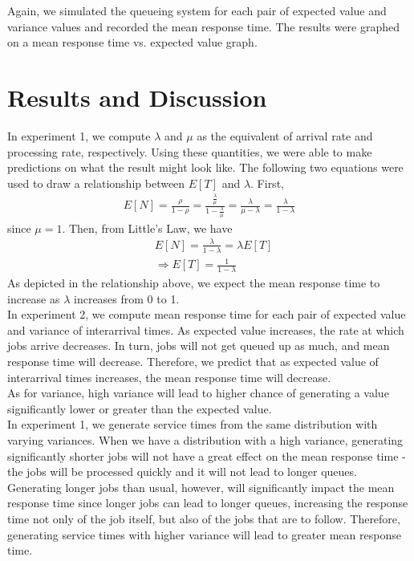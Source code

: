 \documentclass[12pt]{article}
\begin{document}
Again, we simulated the queueing system for each pair of expected value and variance values and recorded the mean response time. The results were graphed on a mean response time vs. expected value graph. 

\section{Results and Discussion} 
In experiment 1, we compute $\lambda$ and $\mu$ as the equivalent of arrival rate and processing rate, respectively. Using these quantities, we were able to make predictions on what the result might look like. The following two equations were used to draw a relationship between $E[T]$ and $\lambda$. First,
\begin{align*}
E[N] = \frac{\rho}{1 - \rho} = \frac{\frac{\lambda}{\mu}}{1 - \frac{\lambda}{\mu}} = \frac{\lambda}{\mu - \lambda} = \frac{\lambda}{1 - \lambda}
\end{align*}
since $\mu = 1$. Then, from Little's Law, we have 
\begin{align*}
&E[N] = \frac{\lambda}{1 - \lambda} = \lambda E[T] \\ 
&\Rightarrow 
E[T] = \frac{1}{1 - \lambda}
\end{align*}
As depicted in the relationship above, we expect the mean response time to increase as $\lambda$ increases from 0 to 1. \\

In experiment 2, we compute mean response time for each pair of expected value and variance of interarrival times. As expected value increases, the rate at which jobs arrive decreases. In turn, jobs will not get queued up as much, and mean response time will decrease. Therefore, we predict that as expected value of interarrival times increases, the mean response time will decrease. \\

As for variance, high variance will lead to higher chance of generating a value significantly lower or greater than the expected value. \\

In experiment 1, we generate service times from the same distribution with varying variances. When we have a distribution with a high variance, generating significantly shorter jobs will not have a great effect on the mean response time - the jobs will be processed quickly and it will not lead to longer queues. Generating longer jobs than usual, however, will significantly impact the mean response time since longer jobs can lead to longer queues, increasing the response time not only of the job itself, but also of the jobs that are to follow. Therefore, generating service times with higher variance will lead to greater mean response time. \\ 
\end{document}
